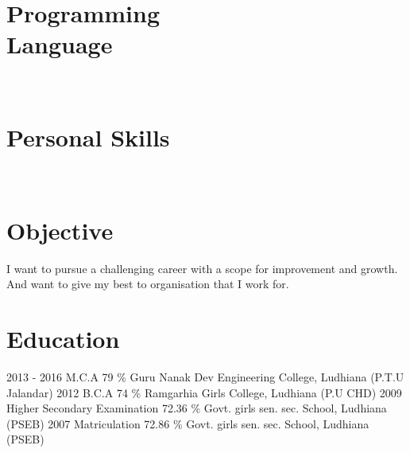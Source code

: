 \documentclass[]{friggeri-cv}
\begin{document}
\begin{aside}
  \section{Programming \\ Language}
    ~
  \section{Personal Skills}
    ~
\end{aside}

\section{Objective}
I want to pursue a challenging career with a scope for improvement and
growth. And want to give my best to organisation that I work for.
\section{Education}
\begin{entrylist}
  \entry
    {2013 - 2016}
    {M.C.A}
    {79 \%}
    {Guru Nanak Dev Engineering College, Ludhiana (P.T.U Jalandar)}
  \entry
    {2012}
    {B.C.A}
    {74 \%}
    {Ramgarhia Girls College, Ludhiana (P.U CHD)}
  \entry
    {2009}
    {Higher Secondary Examination}
    {72.36 \%}
    {Govt. girls sen. sec. School,
Ludhiana (PSEB)}
    \entry
    {2007}
    {Matriculation}
    {72.86 \%}
    {Govt. girls sen. sec. School,
Ludhiana (PSEB)}
\end{entrylist}
\end{document}
